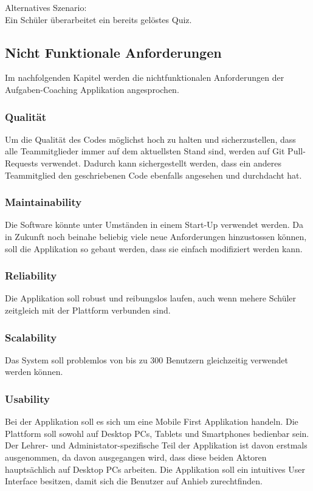 \noindent Alternatives Szenario: \\
Ein Schüler überarbeitet ein bereits gelöstes Quiz. \\


\subsection{Nicht Funktionale Anforderungen}
Im nachfolgenden Kapitel werden die nichtfunktionalen Anforderungen der Aufgaben-Coaching Applikation angesprochen.

\subsubsection{Qualität}
Um die Qualität des Codes möglichst hoch zu halten und sicherzustellen, dass alle Teammitglieder immer auf dem aktuellsten Stand sind, werden auf Git Pull-Requests verwendet. Dadurch kann sichergestellt werden, dass ein anderes Teammitglied den geschriebenen Code ebenfalls angesehen und durchdacht hat.

\subsubsection*{Maintainability}
Die Software könnte unter Umständen in einem Start-Up verwendet werden. Da in Zukunft noch beinahe beliebig viele neue Anforderungen hinzustossen können, soll die Applikation so gebaut werden, dass sie einfach modifiziert werden kann. 

\subsubsection*{Reliability}
Die Applikation soll robust und reibungslos laufen, auch wenn mehere Schüler zeitgleich mit der Plattform verbunden sind.

\subsubsection*{Scalability}
Das System soll problemlos von bis zu 300 Benutzern gleichzeitig verwendet werden können. 

\subsubsection*{Usability}
Bei der Applikation soll es sich um eine Mobile First Applikation handeln. Die Plattform soll sowohl auf Desktop PCs, Tablets und Smartphones bedienbar sein. Der Lehrer- und Administator-spezifische Teil der Applikation ist davon erstmals ausgenommen, da davon ausgegangen wird, dass diese beiden Aktoren hauptsächlich auf Desktop PCs arbeiten. 
Die Applikation soll ein intuitives User Interface besitzen, damit sich die Benutzer auf Anhieb zurechtfinden. 

